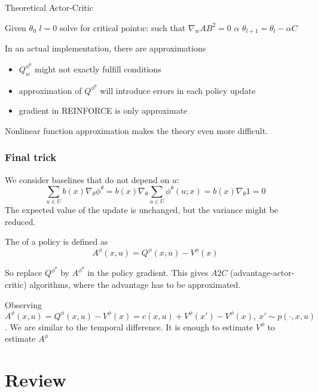 \begin{algorithm}[H]
    \caption{Theoretical Actor-Critic}\label{alg:tac}
    \begin{algorithmic}
    \State Given \(\theta_0\)
    \State $l=0$
        \State solve for critical point\(w\): such that \(\nabla_w AB^2=0\)
        \State \(\alpha\)
        \State \(\theta_{l+1}=\theta_l-\alpha C\)
    \EndWhile
\end{algorithmic}
\end{algorithm}

In an actual implementation, there are approximations 
\begin{itemize}
    \item \(Q_w^{\phi^\theta}\) might not exactly fulfill conditions 
    \item approximation of \(Q^{\phi^\theta}\) will introduce errors in each policy update 
    \item gradient in REINFORCE is only approximate
\end{itemize}

Nonlinear function approximation makes the theory even more difficult.

\subsection{Final trick}
We consider baselines that do not depend on \(u:\)
\[\sum_{u\in U}b(x)\nabla_\theta\phi^\theta=b(x)\nabla_\theta\sum_{u\in U}\phi^\theta(u;x)=b(x)\nabla_\theta 1=0\] 
The expected value of the update is unchanged, but the variance might be reduced.

\begin{definition}\label{def:64}
    The  of a policy is defined as 
    \[A^\phi(x,u)=Q^\phi(x,u)-V^\phi(x)\]
\end{definition}

So replace  \(Q^{\phi^\theta}\) by \(A^{\phi^\theta}\) in the policy gradient.
This gives \(A2C\) (advantage-actor-critic) algorithms, where 
the advantage has to be approximated.

Observing \(A^{\phi}(x,u)=Q^\phi(x,u)-V^\phi(x)=c(x,u)+V^\phi(x')-V^\phi(x),\ x'\sim p(\cdot,x,u)\).
We are similar to the temporal difference. It is enough to estimate \(V^\phi\) to estimate \(A^\phi\)


\chapter{Review}


